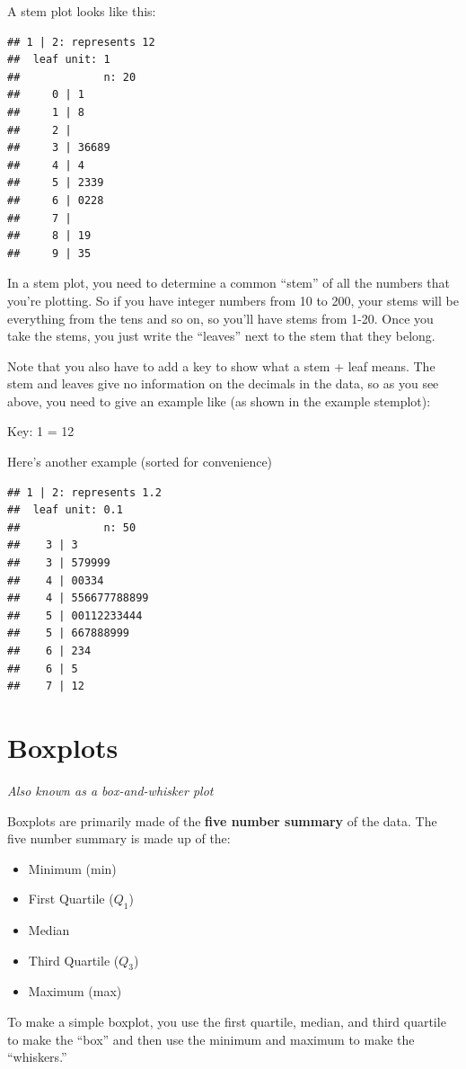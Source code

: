 \documentclass[
]{book}
\begin{document}
A stem plot looks like this:

\begin{verbatim}
## 1 | 2: represents 12
##  leaf unit: 1
##             n: 20
##     0 | 1
##     1 | 8
##     2 | 
##     3 | 36689
##     4 | 4
##     5 | 2339
##     6 | 0228
##     7 | 
##     8 | 19
##     9 | 35
\end{verbatim}

In a stem plot, you need to determine a common ``stem'' of all the numbers
that you're plotting. So if you have integer numbers from 10 to 200,
your stems will be everything from the tens and so on, so you'll have
stems from 1-20. Once you take the stems, you just write the ``leaves''
next to the stem that they belong.

Note that you also have to add a key to show what a stem + leaf means.
The stem and leaves give no information on the decimals in the data, so
as you see above, you need to give an example like (as shown in the
example stemplot):

Key: 1 = 12

Here's another example (sorted for convenience)

\begin{verbatim}
## 1 | 2: represents 1.2
##  leaf unit: 0.1
##             n: 50
##    3 | 3
##    3 | 579999
##    4 | 00334
##    4 | 556677788899
##    5 | 00112233444
##    5 | 667888999
##    6 | 234
##    6 | 5
##    7 | 12
\end{verbatim}

\hypertarget{boxplots}{%
\section{Boxplots}\label{boxplots}}

\emph{Also known as a box-and-whisker plot}

Boxplots are primarily made of the \textbf{five number summary} of the data.
The five number summary is made up of the:

\begin{itemize}
\item
  Minimum (min)
\item
  First Quartile (\(Q_1\))
\item
  Median
\item
  Third Quartile (\(Q_3\))
\item
  Maximum (max)
\end{itemize}

To make a simple boxplot, you use the first quartile, median, and third
quartile to make the ``box'' and then use the minimum and maximum to make
the ``whiskers.''
\end{document}
